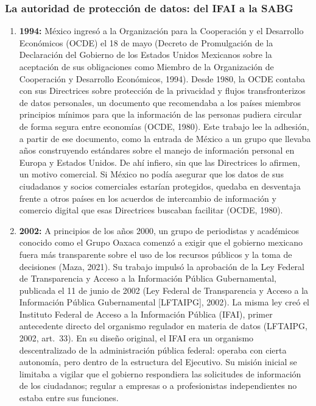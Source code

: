 \documentclass[12pt, a4paper]{article}
\begin{document}
\subsubsection{La autoridad de protección de datos: del IFAI a la SABG}
 
\begin{enumerate}[label=\Roman*.]
 
  \item \textbf{1994:} México ingresó a la Organización para la
  Cooperación y el Desarrollo Económicos (OCDE) el 18 de mayo (Decreto de
  Promulgación de la Declaración del Gobierno de los Estados Unidos
  Mexicanos sobre la aceptación de sus obligaciones como Miembro de la
  Organización de Cooperación y Desarrollo Económicos, 1994). Desde
  1980, la OCDE contaba con sus Directrices sobre protección de la
  privacidad y flujos transfronterizos de datos personales, un
  documento que recomendaba a los países miembros principios mínimos
  para que la información de las personas pudiera circular de forma
  segura entre economías (OCDE, 1980). Este trabajo lee la adhesión,
  a partir de ese documento, como la entrada de México a un grupo que
  llevaba años construyendo estándares sobre el manejo de información
  personal en Europa y Estados Unidos. De ahí infiero, sin
  que las Directrices lo afirmen, un motivo comercial. Si México no
  podía asegurar que los datos de sus ciudadanos y socios comerciales
  estarían protegidos, quedaba en desventaja frente a otros países en
  los acuerdos de intercambio de información y comercio digital que
  esas Directrices buscaban facilitar (OCDE, 1980).
 
  \item \textbf{2002:} A principios de los años 2000, un grupo de
  periodistas y académicos conocido como el Grupo Oaxaca comenzó a
  exigir que el gobierno mexicano fuera más transparente sobre el uso
  de los recursos públicos y la toma de decisiones (Maza, 2021). Su
  trabajo impulsó la aprobación de la Ley Federal de
  Transparencia y Acceso a la Información Pública Gubernamental,
  publicada el 11 de junio de 2002 (Ley Federal de Transparencia y
  Acceso a la Información Pública Gubernamental [LFTAIPG], 2002). La
  misma ley creó el Instituto Federal de Acceso a la Información
  Pública (IFAI), primer antecedente directo del organismo regulador
  en materia de datos (LFTAIPG, 2002, art.~33). En su diseño
  original, el IFAI era un organismo descentralizado de la
  administración pública federal: operaba con cierta
  autonomía, pero dentro de la estructura del Ejecutivo. Su misión
  inicial se limitaba a vigilar que el gobierno respondiera las
  solicitudes de información de los ciudadanos; regular a empresas
  o a profesionistas independientes no estaba entre sus funciones.
 

\end{enumerate}
\end{document}
